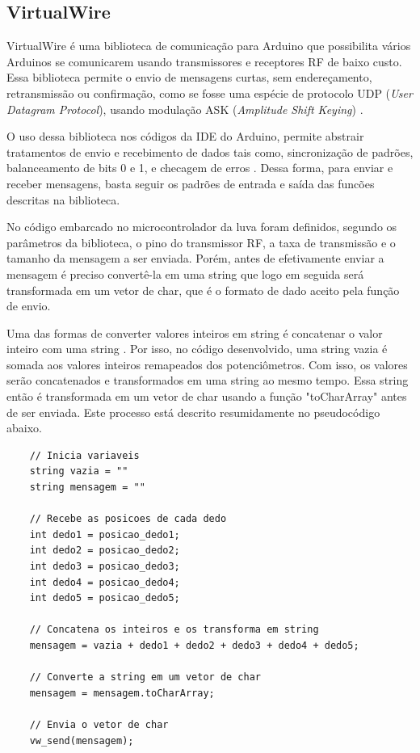 \documentclass[
	12pt,				%
	openright,			%
	oneside,			%
	a4paper,			%
	english,			%
	brazil				%
	]{abntex2}
\begin{document}
		
		\subsection{VirtualWire}

		VirtualWire é uma biblioteca de comunicação para Arduino que possibilita vários Arduinos se comunicarem usando transmissores e receptores RF de baixo custo. Essa biblioteca permite o envio de mensagens curtas, sem endereçamento, retransmissão ou confirmação, como se fosse uma espécie de protocolo UDP (\textit{User Datagram Protocol}), usando modulação ASK (\textit{Amplitude Shift Keying}) \cite{virtualwiremanual}. 

		O uso dessa biblioteca nos códigos da IDE do Arduino, permite abstrair tratamentos de envio e recebimento de dados tais como, sincronização de padrões, balanceamento de bits 0 e 1, e checagem de erros \cite{virtualwirepjrc}. Dessa forma, para enviar e receber mensagens, basta seguir os padrões de entrada e saída das funcões descritas na biblioteca.

		No código embarcado no microcontrolador da luva foram definidos, segundo os parâmetros da biblioteca, o pino do transmissor RF, a taxa de transmissão e o tamanho da mensagem a ser enviada. Porém, antes de efetivamente enviar a mensagem é preciso convertê-la em uma string que logo em seguida será transformada em um vetor de char, que é o formato de dado aceito pela função de envio.

		Uma das formas de converter valores inteiros em string é concatenar o valor inteiro com uma string \cite{arduinostringadd}. Por isso, no código desenvolvido, uma string vazia é somada aos valores inteiros remapeados dos potenciômetros. Com isso, os valores serão concatenados e transformados em uma string ao mesmo tempo. Essa string então é transformada em um vetor de char usando a função "toCharArray" antes de ser enviada. Este processo está descrito resumidamente no pseudocódigo abaixo.		

\begin{lstlisting}
	// Inicia variaveis
	string vazia = ""
	string mensagem = ""
	
	// Recebe as posicoes de cada dedo
	int dedo1 = posicao_dedo1;
	int dedo2 = posicao_dedo2;
	int dedo3 = posicao_dedo3;
	int dedo4 = posicao_dedo4;
	int dedo5 = posicao_dedo5;

	// Concatena os inteiros e os transforma em string
	mensagem = vazia + dedo1 + dedo2 + dedo3 + dedo4 + dedo5;

	// Converte a string em um vetor de char
	mensagem = mensagem.toCharArray;

	// Envia o vetor de char
	vw_send(mensagem);

\end{lstlisting}
\end{document}
